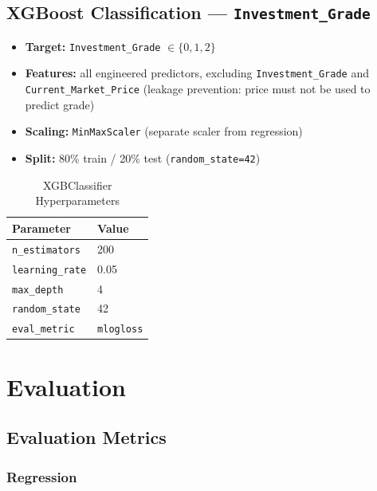 \documentclass[12pt,a4paper]{article}
\begin{document}
\subsection{XGBoost Classification --- \texttt{Investment\_Grade}}

\begin{itemize}[noitemsep]
    \item \textbf{Target:} \texttt{Investment\_Grade} $\in \{0, 1, 2\}$
    \item \textbf{Features:} all engineered predictors, excluding \texttt{Investment\_Grade}
          and \texttt{Current\_Market\_Price} (leakage prevention: price must not be used to predict grade)
    \item \textbf{Scaling:} \texttt{MinMaxScaler} (separate scaler from regression)
    \item \textbf{Split:} 80\% train / 20\% test (\texttt{random\_state=42})
\end{itemize}

\begin{table}[H]
\centering
\caption{XGBClassifier Hyperparameters}
\begin{tabular}{@{} l l @{}}
\toprule
\textbf{Parameter} & \textbf{Value} \\
\midrule
\texttt{n\_estimators}  & 200            \\
\texttt{learning\_rate} & 0.05           \\
\texttt{max\_depth}     & 4              \\
\texttt{random\_state}  & 42             \\
\texttt{eval\_metric}   & \texttt{mlogloss} \\
\bottomrule
\end{tabular}
\end{table}

\section{Evaluation}

\subsection{Evaluation Metrics}

\subsubsection{Regression}
\end{document}
